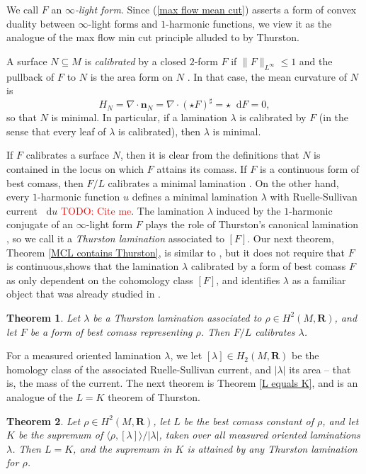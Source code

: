 \documentclass[reqno,11pt]{amsart}
\newcommand{\RR}{\mathbf{R}}
\newcommand*\dif{\mathop{}\!\mathrm{d}}
\newcommand{\normal}{\mathbf n}
\newcommand{\dfn}[1]{\emph{#1}\index{#1}}
\newtheorem{mainthm}{Theorem}
\theoremstyle{definition}
\numberwithin{equation}{section}
\newcommand\todo[1]{\textcolor{red}{TODO: #1}}
\begin{document}
We call $F$ an \dfn{$\infty$-light form}.
Since (\ref{max flow mean cut}) asserts a form of convex duality between $\infty$-light forms and $1$-harmonic functions, we view it as the analogue of the max flow min cut principle alluded to by Thurston.

A surface $N \subseteq M$ is \dfn{calibrated} by a closed $2$-form $F$ if $\|F\|_{L^\infty} \leq 1$ and the pullback of $F$ to $N$ is the area form on $N$ \cite{Harvey82}.
In that case, the mean curvature of $N$ is 
$$H_N = \nabla \cdot \normal_N = \nabla \cdot (\star F)^\sharp = \star \dif F = 0,$$
so that $N$ is minimal. 
In particular, if a lamination $\lambda$ is calibrated by $F$ (in the sense that every leaf of $\lambda$ is calibrated), then $\lambda$ is minimal.

If $F$ calibrates a surface $N$, then it is clear from the definitions that $N$ is contained in the locus on which $F$ attains its comass.
If $F$ is a continuous form of best comass, then $F/L$ calibrates a minimal lamination \cite{bangert_cui_2017}.
On the other hand, every $1$-harmonic function $u$ defines a minimal lamination $\lambda$ with Ruelle-Sullivan current $\dif u$ \todo{Cite me}.
The lamination $\lambda$ induced by the $1$-harmonic conjugate of an $\infty$-light form $F$ plays the role of Thurston's canonical lamination \cite{Thurston98}, so we call it a \dfn{Thurston lamination} associated to $[F]$.
Our next theorem, Theorem \ref{MCL contains Thurston}, is similar to \cite[Theorem 5.1]{bangert_cui_2017}, but it does not require that $F$ is continuous,shows that the lamination $\lambda$ calibrated by a form of best comass $F$ as only dependent on the cohomology class $[F]$, and identifies $\lambda$ as a familiar object that was already studied in \cite{daskalopoulos2020transverse}.

\begin{mainthm}
Let $\lambda$ be a Thurston lamination associated to $\rho \in H^2(M, \RR)$, and let $F$ be a form of best comass representing $\rho$.
Then $F/L$ calibrates $\lambda$. 
\end{mainthm}

For a measured oriented lamination $\lambda$, we let $[\lambda] \in H_2(M, \RR)$ be the homology class of the associated Ruelle-Sullivan current, and $|\lambda|$ its area -- that is, the mass of the current.
The next theorem is Theorem \ref{L equals K}, and is an analogue of the $L = K$ theorem of Thurston.

\begin{mainthm}
Let $\rho \in H^2(M, \RR)$, let $L$ be the best comass constant of $\rho$, and let $K$ be the supremum of $\langle \rho, [\lambda]\rangle/|\lambda|$, taken over all measured oriented laminations $\lambda$.
Then $L = K$, and the supremum in $K$ is attained by any Thurston lamination for $\rho$.
\end{mainthm}
\end{document}
